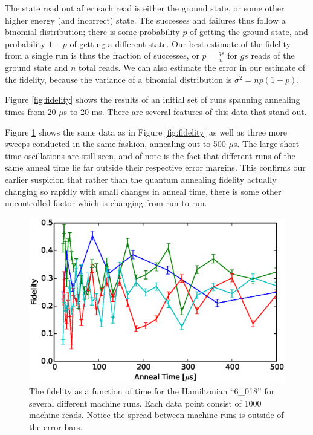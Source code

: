 The state read out after each read is either the ground state, or some other higher energy (and incorrect) state.  The successes and failures thus follow a binomial distribution; there is some probability $p$ of getting the ground state, and probability $1-p$ of getting a different state.
Our best estimate of the fidelity from a single run is thus the fraction of successes, or $p = \frac{gs}{n}$ for $gs$ reads of the ground state and $n$ total reads.  We can also estimate the error in our estimate of the fidelity, because the variance of a binomial distribution is $\sigma^2 = np(1-p)$.

Figure \ref{fig:fidelity} shows the results of an initial set of runs spanning annealing times from 20 $\mu$s to 20 ms.  
There are several features of this data that stand out.  

Figure \ref{fig:short_fidelity} shows the same data as in Figure \ref{fig:fidelity} as well as three more sweeps conducted in the same fashion, annealing out to 500 $\mu$s.  The large-short time oscillations are still seen, and of note is the fact that different runs of the same anneal time lie far outside their respective error margins.  This confirms our earlier suspicion that rather than the quantum annealing fidelity actually changing so rapidly with small changes in anneal time, there is some other uncontrolled factor which is changing from run to run.

\begin{figure}
	\includegraphics{img/6_018_comparison.eps}
	\caption[Short Time Fidelities]{The fidelity as a function of time for the Hamiltonian ``6\_018'' for several different machine runs.  Each data point consist of 1000 machine reads.  Notice the spread between machine runs is outside of the error bars.}
	\label{fig:short_fidelity}
\end{figure}





